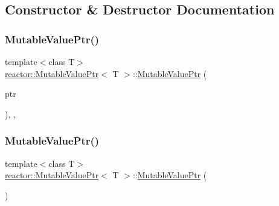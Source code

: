 \subsection{Constructor \& Destructor Documentation}
\mbox{\label{classreactor_1_1MutableValuePtr_a574ef3eecbb139aa2c814c394d753d4a}} 
\subsubsection{\texorpdfstring{Mutable\+Value\+Ptr()}{MutableValuePtr()}\hspace{0.1cm}{\footnotesize\ttfamily [1/5]}}
{\footnotesize\ttfamily template$<$class T$>$ \\
\hyperlink{classreactor_1_1MutableValuePtr}{reactor\+::\+Mutable\+Value\+Ptr}$<$ T $>$\+::\hyperlink{classreactor_1_1MutableValuePtr}{Mutable\+Value\+Ptr} (\begin{DoxyParamCaption}\item[{\hyperlink{classreactor_1_1MutableValuePtr_a6dfaa60279549db876d8ea8b1135b46a}{type} $\ast$}]{ptr }\end{DoxyParamCaption})\hspace{0.3cm}{\ttfamily [inline]}, {\ttfamily [explicit]}, {\ttfamily [private]}}

\mbox{\label{classreactor_1_1MutableValuePtr_a57b5bbf2f04f30649ed7629400cfc962}} 
\subsubsection{\texorpdfstring{Mutable\+Value\+Ptr()}{MutableValuePtr()}\hspace{0.1cm}{\footnotesize\ttfamily [2/5]}}
{\footnotesize\ttfamily template$<$class T$>$ \\
\hyperlink{classreactor_1_1MutableValuePtr}{reactor\+::\+Mutable\+Value\+Ptr}$<$ T $>$\+::\hyperlink{classreactor_1_1MutableValuePtr}{Mutable\+Value\+Ptr} (\begin{DoxyParamCaption}\item[{const \hyperlink{classreactor_1_1MutableValuePtr}{Mutable\+Value\+Ptr}$<$ T $>$ \&}]{ }\end{DoxyParamCaption})\hspace{0.3cm}{\ttfamily [delete]}}

